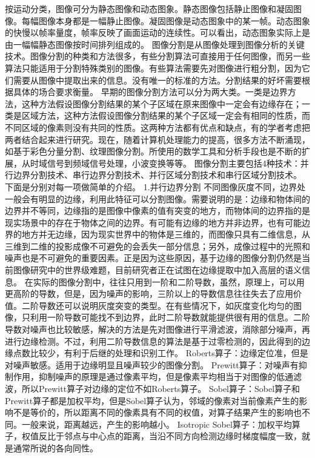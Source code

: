 \documentclass[18pt, twoside, a4paper, dvipdfm]{book}
\begin{document}
按运动分类，图像可分为静态图像和动态图象。静态图像包括静止图像和凝固图像。每幅图像本身都是一幅静止图像。凝固图像是动态图象中的某一帧。动态图象的快慢以帧率量度，帧率反映了画面运动的连续性。可以看出，动态图象实际上是由一幅幅静态图像按时间排列组成的。
图像分割是从图像处理到图像分析的关键技术。图像分割的种类和方法很多，有些分割算法可直接用于任何图像，而另一些算法只能适用于分割特殊类别的图像。有些算法需要先对图像进行粗分割，因为它们需要从图像中提取出来的信息。没有唯一的标准的方法。分割结果的好坏需要根据具体的场合要求衡量。
早期的图像分割方法可以分为两大类。一类是边界方法，这种方法假设图像分割结果的某个子区域在原来图像中一定会有边缘存在；一类是区域方法，这种方法假设图像分割结果的某个子区域一定会有相同的性质，而不同区域的像素则没有共同的性质。这两种方法都有优点和缺点，有的学者考虑把两者结合起来进行研究。现在，随着计算机处理能力的提高，很多方法不断涌现，如基于彩色分量分割、纹理图像分割。所使用的数学工具和分析手段也是不断的扩展，从时域信号到频域信号处理，小波变换等等。
图像分割主要包括4种技术：并行边界分割技术、串行边界分割技术、并行区域分割技术和串行区域分割技术。
下面是分别对每一项做简单的介绍。
1.并行边界分割
不同图像灰度不同，边界处一般会有明显的边缘，利用此特征可以分割图像。需要说明的是：边缘和物体间的边界并不等同，边缘指的是图像中像素的值有突变的地方，而物体间的边界指的是现实场景中的存在于物体之间的边界。有可能有边缘的地方并非边界，也有可能边界的地方并无边缘，因为现实世界中的物体是三维的，而图像只具有二维信息，从三维到二维的投影成像不可避免的会丢失一部分信息；另外，成像过程中的光照和噪声也是不可避免的重要因素。正是因为这些原因，基于边缘的图像分割仍然是当前图像研究中的世界级难题，目前研究者正在试图在边缘提取中加入高层的语义信息。
在实际的图像分割中，往往只用到一阶和二阶导数，虽然，原理上，可以用更高阶的导数，但是，因为噪声的影响，三阶以上的导数信息往往失去了应用价值。二阶导数还可以说明灰度突变的类型。在有些情况下，如灰度变化均匀的图像，只利用一阶导数可能找不到边界，此时二阶导数就能提供很有用的信息。二阶导数对噪声也比较敏感，解决的方法是先对图像进行平滑滤波，消除部分噪声，再进行边缘检测。不过，利用二阶导数信息的算法是基于过零检测的，因此得到的边缘点数比较少，有利于后继的处理和识别工作。
Roberts算子：边缘定位准，但是对噪声敏感。适用于边缘明显且噪声较少的图像分割。
Prewitt算子：对噪声有抑制作用，抑制噪声的原理是通过像素平均，但是像素平均相当于对图像的低通滤波，所以Prewitt算子对边缘的定位不如Roberts算子。
Sobel算子：Sobel算子和Prewitt算子都是加权平均，但是Sobel算子认为，邻域的像素对当前像素产生的影响不是等价的，所以距离不同的像素具有不同的权值，对算子结果产生的影响也不同。一般来说，距离越远，产生的影响越小。
Isotropic Sobel算子：加权平均算子，权值反比于邻点与中心点的距离，当沿不同方向检测边缘时梯度幅度一致，就是通常所说的各向同性。
\end{document}
